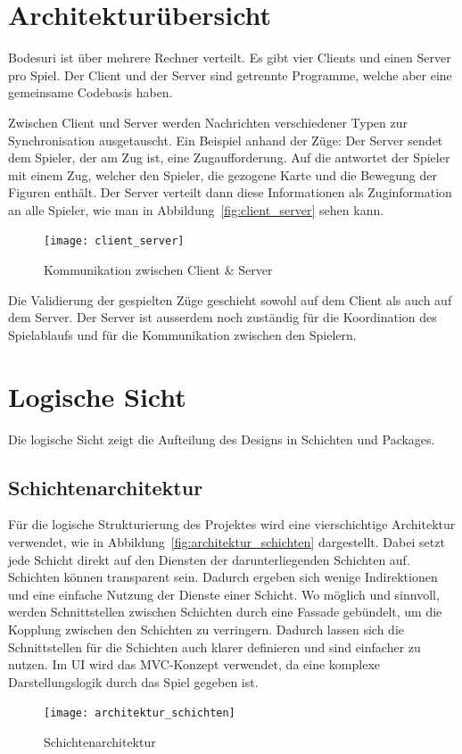 \documentclass[12pt,halfparskip]{scrartcl}
\begin{document}


\section{Architekturübersicht}

Bodesuri ist über mehrere Rechner verteilt. Es gibt vier Clients und einen Server pro Spiel. Der Client und der Server sind getrennte Programme, welche aber eine gemeinsame Codebasis haben.

Zwischen Client und Server werden Nachrichten verschiedener Typen zur Synchronisation ausgetauscht. Ein Beispiel anhand der Züge: Der Server sendet dem Spieler, der am Zug ist, eine Zugaufforderung. Auf die antwortet der Spieler mit einem Zug, welcher den Spieler, die gezogene Karte und die Bewegung der Figuren enthält. Der Server verteilt dann diese Informationen als Zuginformation an alle Spieler, wie man in Abbildung~\vref{fig:client_server} sehen kann.

\begin{figure}[h]
	\centering
	\texttt{[image: client\_server]}
	\caption{Kommunikation zwischen Client \& Server}
	\label{fig:client_server}
\end{figure}

Die Validierung der gespielten Züge geschieht sowohl auf dem Client als auch auf dem Server. Der Server ist ausserdem noch zuständig für die Koordination des Spielablaufs und für die Kommunikation zwischen den Spielern.

\clearpage
\section{Logische Sicht}

Die logische Sicht zeigt die Aufteilung des Designs in Schichten und Packages.

\subsection{Schichtenarchitektur}

Für die logische Strukturierung des Projektes wird eine vierschichtige Architektur verwendet, wie in Abbildung~\vref{fig:architektur_schichten} dargestellt. Dabei setzt jede Schicht direkt auf den Diensten der darunterliegenden Schichten auf. Schichten können transparent sein. Dadurch ergeben sich wenige Indirektionen und eine einfache Nutzung der Dienste einer Schicht. Wo möglich und sinnvoll, werden Schnittstellen zwischen Schichten durch eine Fassade gebündelt, um die Kopplung zwischen den Schichten zu verringern. Dadurch lassen sich die Schnittstellen für die Schichten auch klarer definieren und sind einfacher zu nutzen. Im UI wird das MVC-Konzept verwendet, da eine komplexe Darstellungslogik durch das Spiel gegeben ist.
\begin{figure}
	\centering
	\texttt{[image: architektur\_schichten]}
	\caption{Schichtenarchitektur}
	\label{fig:architektur_schichten}
\end{figure}
\end{document}
